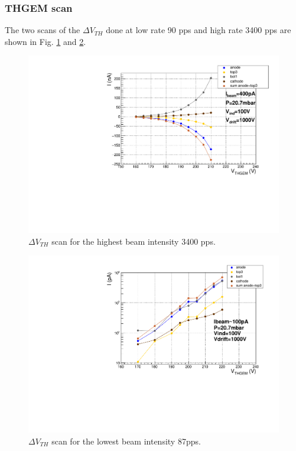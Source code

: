 \documentclass[a4paper, 11 pt]{report}
\newcommand{\Vthgem}{$\Delta V_{TH}$}
\begin{document}
  \subsubsection{THGEM scan}
  The two scans of the \Vthgem{} done at low rate 90 pps and high rate 3400 pps are shown in Fig.
  \ref{fig:driftScan_withBeam_H} and \ref{fig:driftScan_withBeam_L}.
  \begin{figure}[htbp]
	\centering
	\includegraphics[width=\textwidth]
	{Immagini/thgemScan_THGEM10_20mbar-Vdrift1000V-2020-03-09.pdf}
	\caption{\Vthgem{} scan for the highest beam intensity 3400 pps. }
	\label{fig:driftScan_withBeam_H}
  \end{figure}
  \begin{figure}[htbp]
	\centering
	\includegraphics[width=\textwidth]
	{Immagini/thgemScan_THGEM10_20mbar_109pA-Vdrift1000V-2020-03-09_logscale.pdf}
	\caption{\Vthgem{} scan for the lowest beam intensity 87pps.}
	\label{fig:driftScan_withBeam_L}
  \end{figure}
\end{document}
